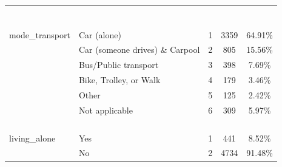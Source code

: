 \documentclass[
  10pt,
]{article}
\begin{document}
\begin{longtable}[t]{llccc}
\cellcolor{gray!6}{} & \cellcolor{gray!6}{Health Sciences} & \cellcolor{gray!6}{4} & \cellcolor{gray!6}{577} & \cellcolor{gray!6}{11.15\%}\\
\cellcolor{gray!6}{} & \cellcolor{gray!6}{Liberal Arts} & \cellcolor{gray!6}{5} & \cellcolor{gray!6}{1274} & \cellcolor{gray!6}{24.62\%}\\
\cellcolor{gray!6}{} & \cellcolor{gray!6}{Science} & \cellcolor{gray!6}{6} & \cellcolor{gray!6}{822} & \cellcolor{gray!6}{15.88\%}\\
\cellcolor{gray!6}{} & \cellcolor{gray!6}{Nursing} & \cellcolor{gray!6}{7} & \cellcolor{gray!6}{423} & \cellcolor{gray!6}{8.17\%}\\
\cellcolor{gray!6}{} & \cellcolor{gray!6}{Pharmacy} & \cellcolor{gray!6}{8} & \cellcolor{gray!6}{41} & \cellcolor{gray!6}{0.79\%}\\
\cellcolor{gray!6}{} & \cellcolor{gray!6}{Other} & \cellcolor{gray!6}{9} & \cellcolor{gray!6}{55} & \cellcolor{gray!6}{1.06\%}\\
\cellcolor{gray!6}{} & \cellcolor{gray!6}{More than one} & \cellcolor{gray!6}{10} & \cellcolor{gray!6}{88} & \cellcolor{gray!6}{1.70\%}\\
mode\_transport & Car (alone) & 1 & 3359 & 64.91\%\\
 & Car (someone drives) \& Carpool & 2 & 805 & 15.56\%\\
 & Bus/Public transport & 3 & 398 & 7.69\%\\
 & Bike, Trolley, or Walk & 4 & 179 & 3.46\%\\
 & Other & 5 & 125 & 2.42\%\\
 & Not applicable & 6 & 309 & 5.97\%\\
\cellcolor{gray!6}{transport\_reliability} & \cellcolor{gray!6}{Not reliable at all} & \cellcolor{gray!6}{1} & \cellcolor{gray!6}{92} & \cellcolor{gray!6}{1.89\%}\\
\cellcolor{gray!6}{} & \cellcolor{gray!6}{Somewhat reliable} & \cellcolor{gray!6}{2} & \cellcolor{gray!6}{429} & \cellcolor{gray!6}{8.82\%}\\
\cellcolor{gray!6}{} & \cellcolor{gray!6}{Fairly reliable} & \cellcolor{gray!6}{3} & \cellcolor{gray!6}{1628} & \cellcolor{gray!6}{33.46\%}\\
\cellcolor{gray!6}{} & \cellcolor{gray!6}{Very reliable} & \cellcolor{gray!6}{4} & \cellcolor{gray!6}{2717} & \cellcolor{gray!6}{55.84\%}\\
living\_alone & Yes & 1 & 441 & 8.52\%\\
 & No & 2 & 4734 & 91.48\%\\

\end{longtable}
\end{document}
